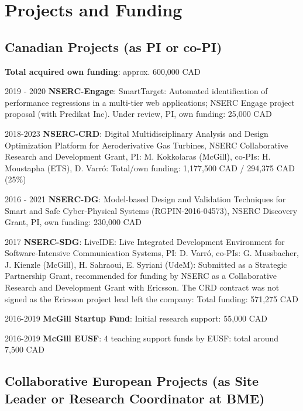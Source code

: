 \newpage 

\section{Projects and Funding} 


\subsection{Canadian Projects (as PI or co-PI)}
\textbf{Total acquired own funding}: approx. 600,000 CAD 

\begin{yearlist}
\item[2019 - 2020] \textbf{NSERC-Engage}: SmartTarget: Automated identification of performance regressions in a multi-tier web applications; NSERC Engage project proposal (with Predikat Inc). Under review, PI, own funding: 25,000 CAD 
\item[2018-2023] \textbf{NSERC-CRD}: Digital Multidisciplinary Analysis and Design Optimization Platform for Aeroderivative Gas Turbines, NSERC Collaborative Research and Development Grant, PI: M. Kokkolaras (McGill), co-PIs: H. Moustapha (ETS), 
D. Varr\'o:  Total/own funding: 1,177,500 CAD / 294,375 CAD (25\%)
\item[2016 - 2021] \textbf{NSERC-DG}: Model-based Design and Validation Techniques for
Smart and Safe Cyber-Physical Systems (RGPIN-2016-04573), NSERC Discovery Grant, PI, own funding: 230,000 CAD 
\item[2017] \textbf{NSERC-SDG}: LiveIDE: Live Integrated Development Environment for Software-Intensive Communication Systems, PI: D. Varr\'o, co-PIs: G. Mussbacher, J. Kienzle (McGill), H. Sahraoui, E. Syriani (UdeM): Submitted as a Strategic Partnership Grant, recommended for funding by NSERC as a Collaborative Research and Development Grant with Ericsson. The CRD contract was not signed as the Ericsson project lead left the company: Total funding: 571,275 CAD
\item[2016-2019] \textbf{McGill Startup Fund}: Initial research support: 55,000 CAD 
\item[2016-2019] \textbf{McGill EUSF}: 4 teaching support funds by EUSF: total around 7,500 CAD 
\end{yearlist}


\subsection{Collaborative European Projects (as Site Leader or Research Coordinator at BME)}

